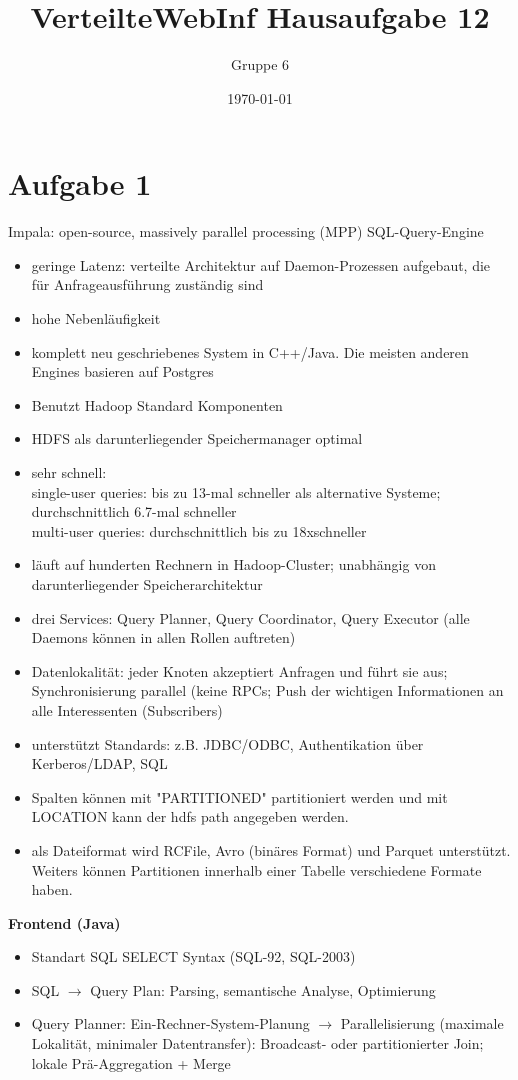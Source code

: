 \documentclass[a4paper]{scrartcl}
\author{Gruppe 6}
\title{\textbf{VerteilteWebInf Hausaufgabe 12}}
\date{\today}
\begin{document}
\maketitle

\section*{Aufgabe 1}
Impala: open-source, massively parallel processing (MPP) SQL-Query-Engine
\begin{itemize}
\item geringe Latenz: verteilte Architektur auf Daemon-Prozessen aufgebaut, die für Anfrageausführung zuständig sind
\item hohe Nebenläufigkeit
\item komplett neu geschriebenes System in C++/Java. Die meisten anderen Engines basieren auf Postgres
\item Benutzt Hadoop Standard Komponenten
\item HDFS als darunterliegender Speichermanager optimal
\item sehr schnell: \\
single-user queries: bis zu 13-mal schneller als alternative Systeme; durchschnittlich 6.7-mal schneller\\
multi-user queries: durchschnittlich bis zu 18xschneller

\item läuft auf hunderten Rechnern in Hadoop-Cluster; unabhängig von darunterliegender Speicherarchitektur
\item drei Services: Query Planner, Query Coordinator, Query Executor (alle Daemons können in allen Rollen auftreten)
\item Datenlokalität: jeder Knoten akzeptiert Anfragen und führt sie aus; Synchronisierung parallel (keine RPCs; Push der wichtigen Informationen an alle Interessenten (Subscribers)
\item unterstützt Standards: z.B. JDBC/ODBC, Authentikation über Kerberos/LDAP, SQL
\item Spalten können mit "PARTITIONED" partitioniert werden und mit LOCATION kann der hdfs path angegeben werden.
\item als Dateiformat wird RCFile, Avro (binäres Format) und Parquet unterstützt. Weiters können Partitionen innerhalb einer Tabelle verschiedene Formate haben.
\end{itemize}

\textbf{Frontend (Java)}
\begin{itemize}
\item Standart SQL SELECT Syntax (SQL-92, SQL-2003)
\item SQL $ \rightarrow $ Query Plan: Parsing, semantische Analyse, Optimierung
\item Query Planner: Ein-Rechner-System-Planung $ \rightarrow $ Parallelisierung (maximale Lokalität, minimaler Datentransfer): Broadcast- oder partitionierter Join; lokale Prä-Aggregation + Merge
\end{itemize}
\end{document}
